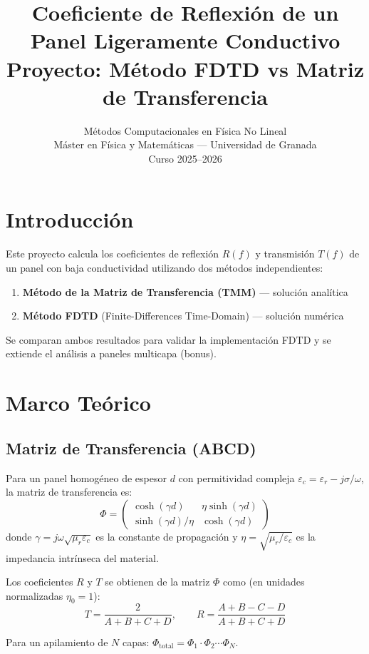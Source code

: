 \documentclass[11pt,a4paper]{article}
\title{\textbf{Coeficiente de Reflexi\'on de un\\Panel Ligeramente Conductivo}\\[0.5em]
       \large Proyecto: M\'etodo FDTD vs Matriz de Transferencia}
\author{M\'etodos Computacionales en F\'isica No Lineal\\
        M\'aster en F\'isica y Matem\'aticas --- Universidad de Granada\\
        Curso 2025--2026}
\date{}
\begin{document}
\maketitle
\thispagestyle{fancy}

\section{Introducci\'on}

Este proyecto calcula los coeficientes de reflexi\'on $R(f)$ y transmisi\'on $T(f)$ de un panel con baja conductividad utilizando dos m\'etodos independientes:
\begin{enumerate}
  \item \textbf{M\'etodo de la Matriz de Transferencia (TMM)} --- soluci\'on anal\'itica
  \item \textbf{M\'etodo FDTD} (Finite-Differences Time-Domain) --- soluci\'on num\'erica
\end{enumerate}
Se comparan ambos resultados para validar la implementaci\'on FDTD y se extiende el an\'alisis a paneles multicapa (bonus).

\section{Marco Te\'orico}

\subsection{Matriz de Transferencia (ABCD)}

Para un panel homog\'eneo de espesor $d$ con permitividad compleja $\varepsilon_c = \varepsilon_r - j\sigma/\omega$, la matriz de transferencia es:
\[
\Phi = \begin{pmatrix} \cosh(\gamma d) & \eta\sinh(\gamma d) \\ \sinh(\gamma d)/\eta & \cosh(\gamma d) \end{pmatrix}
\]
donde $\gamma = j\omega\sqrt{\mu_r\varepsilon_c}$ es la constante de propagaci\'on y $\eta = \sqrt{\mu_r/\varepsilon_c}$ es la impedancia intr\'inseca del material.

Los coeficientes $R$ y $T$ se obtienen de la matriz $\Phi$ como (en unidades normalizadas $\eta_0=1$):
\[
T = \frac{2}{A + B + C + D}, \qquad
R = \frac{A + B - C - D}{A + B + C + D}
\]

Para un apilamiento de $N$ capas: $\Phi_{\text{total}} = \Phi_1 \cdot \Phi_2 \cdots \Phi_N$.
\end{document}
